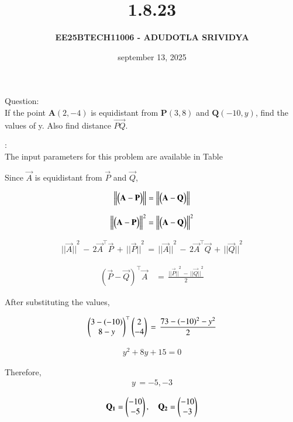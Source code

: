 \documentclass[journal]{IEEEtran}
\title{\textbf{1.8.23}}
\author{\textbf{EE25BTECH11006 - ADUDOTLA SRIVIDYA}}
\date{september 13, 2025}
\begin{document}
\maketitle

Question:\\
 If the point $\textbf{A}(2,-4)$ is equidistant from $\textbf{P}(3,8)$ and $\textbf{Q}(-10,y)$, find the values of y.
 Also find distance $\vec{PQ}$.

\solution:\\
The input parameters for this problem are available in Table 


Since $\vec{A}$ is equidistant from $\vec{P}$ and $\vec{Q}$,

\begin{align}
    \left\lVert\begin{pmatrix}\mathbf{A} - \mathbf{P}\end{pmatrix}\right\rVert = \left\lVert\begin{pmatrix}\mathbf{A} - \mathbf{Q}\end{pmatrix}\right\rVert
\end{align}

\begin{align}
     \left\lVert\begin{pmatrix}\mathbf{A} - \mathbf{P}\end{pmatrix}\right\rVert^2 = \left\lVert\begin{pmatrix}\mathbf{A} - \mathbf{Q}\end{pmatrix}\right\rVert^2
\end{align}

\begin{align}
 {||\vec{A}||}^2 \, - \, 2\vec{A}^\top\vec{P} \, + \, {||\vec{P}||}^2 \, = \, {||\vec{A}||}^2 \, - \, 2\vec{A}^\top\vec{Q} \, + \, {||\vec{Q}||}^2
\end{align}

\begin{align}
    {(\vec{P} - \vec{Q})}^\top \vec{A} \, &= \, \frac{{||\vec{P}||}^2\, - \, {||\vec{Q}||}^2}{2}
\end{align}

After substituting the values,

\begin{align}
    \begin{pmatrix}3-(-10)\\8-y\end{pmatrix}^\top\begin{pmatrix}2\\-4\end{pmatrix}\, = \, \frac{73-(-10)^2 -y^2}{2}
\end{align}

\begin{align}
    y^2 +8y + 15 = 0
\end{align}

Therefore,
\begin{align}
    y \, = -5 , -3
\end{align}

\begin{align}
   \mathbf{Q_1} = \begin{pmatrix}-10 \\ -5\end{pmatrix}, \quad
   \mathbf{Q_2} = \begin{pmatrix}-10 \\ -3\end{pmatrix}
\end{align}
\end{document}
